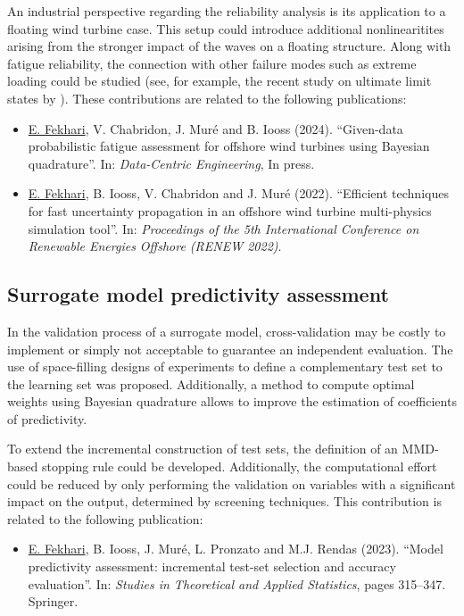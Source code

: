 An industrial perspective regarding the reliability analysis is its application to a floating wind turbine case. 
This setup could introduce additional nonlinearitites arising from the stronger impact of the waves on a floating structure. 
Along with fatigue reliability, the connection with other failure modes such as extreme loading could be studied (see, for example, the recent study on ultimate limit states by \citealp{wang_schar_2023_uls}). 
These contributions are related to the following publications:
\begin{itemize}
    \footnotesize
    \item[\ding{125}] \underline{E. Fekhari}, V. Chabridon, J. Muré and B. Iooss (2024). ``Given-data probabilistic fatigue assessment for offshore wind turbines using Bayesian quadrature''. In: \textit{Data-Centric Engineering}, In press.
    \item[\ding{125}] \underline{E. Fekhari}, B. Iooss, V. Chabridon and J. Muré (2022). ``Efficient techniques for fast uncertainty propagation in an offshore wind turbine multi-physics simulation tool''. In: \textit{Proceedings of the 5th International Conference on Renewable Energies Offshore (RENEW 2022)}.
\end{itemize}

\subsection*{Surrogate model predictivity assessment}

In the validation process of a surrogate model, cross-validation may be costly to implement or simply not acceptable to guarantee an independent evaluation.  
The use of space-filling designs of experiments to define a complementary test set to the learning set was proposed. 
Additionally, a method to compute optimal weights using Bayesian quadrature allows to improve the estimation of coefficients of predictivity. 

To extend the incremental construction of test sets, the definition of an MMD-based stopping rule could be developed. 
Additionally, the computational effort could be reduced by only performing the validation on variables with a significant impact on the output, determined by screening techniques. 
This contribution is related to the following publication:
\begin{itemize}
    \footnotesize
    \item[\ding{125}] \underline{E. Fekhari}, B. Iooss, J. Muré, L. Pronzato and M.J. Rendas (2023). ``Model predictivity assessment: incremental test-set selection and accuracy evaluation''. In: \textit{Studies in Theoretical and Applied Statistics}, pages 315--347. Springer.
\end{itemize}

